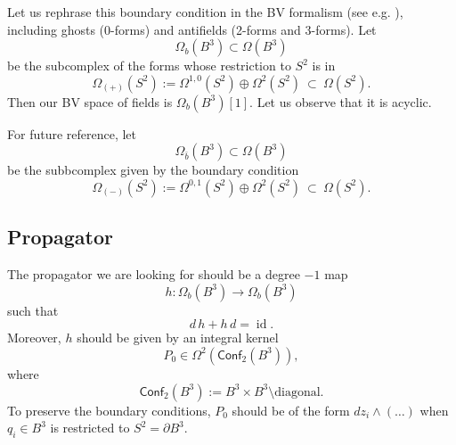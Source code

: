 \documentclass[a4paper]{amsart}
\theoremstyle{plain}
\theoremstyle{definition}
\newcommand{\on}{\operatorname}
\newcommand{\id}{\on{id}}
\newcommand{\cf}{\mathsf{Conf}}
\begin{document}
Let us rephrase this boundary condition in the BV formalism {\color{teal} (see e.g. \cite{PSV})}, including ghosts (0-forms) and antifields (2-forms and 3-forms). Let 
$$\Omega_b(B^3)\subset\Omega(B^3)$$
be the subcomplex of the forms whose restriction to $S^2$ is in
$$\Omega_{(+)}(S^2):=\Omega^{1,0}(S^2)\oplus\Omega^2(S^2)\ \subset\ \Omega(S^2).$$
Then our BV space of fields is
$\Omega_b(B^3)[1]$.
Let us observe that it is acyclic.


For future reference, let 
$$\Omega_{\bar b}(B^3)\subset\Omega(B^3)$$
be the subbcomplex given by the boundary condition
$$\Omega_{(-)}(S^2):=\Omega^{0,1}(S^2)\oplus\Omega^2(S^2)\ \subset\ \Omega(S^2).$$


\subsection{Propagator}\label{ssec:Propagator}
The propagator we are looking for should be a degree $-1$ map 
$$h\colon\Omega_b(B^3)\to\Omega_b(B^3)$$
such that
$$d\,h+h\,d=\id.$$
Moreover, $h$ should be given by an integral kernel 
$$P_0\in\Omega^2(\cf_2(B^3)),$$
where
$$\cf_2(B^3):=B^3\times B^3\setminus\text{diagonal}.$$
{\color{teal} To preserve the boundary conditions, $P_{0}$ should be of the form $dz_{i}\wedge (\dots)$ when $q_{i}\in B^{3}$ is restricted to $S^{2} = \partial B^{3}$.}
\end{document}
